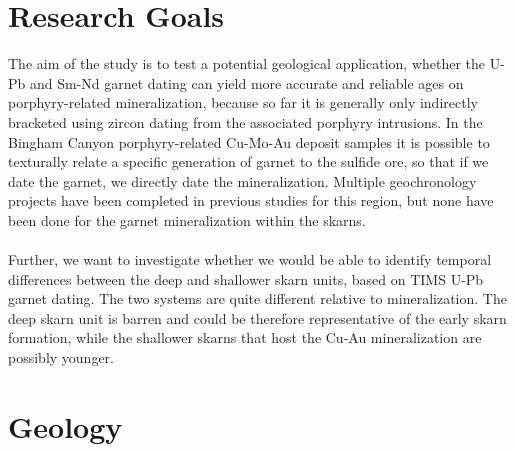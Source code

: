 \documentclass[a4paper,11pt,titlepage]{article}
\begin{document}

\vspace*{10pt}
\section{Research Goals}

The aim of the study is to test a potential geological application, whether the U-Pb and Sm-Nd garnet dating can yield more accurate and reliable ages on porphyry-related mineralization, because so far it is generally only indirectly bracketed using zircon dating from the associated porphyry intrusions. In the Bingham Canyon porphyry-related Cu-Mo-Au deposit samples it is possible to texturally relate a specific generation of garnet to the sulfide ore, so that if we date the garnet, we directly date the mineralization. Multiple geochronology projects have been completed in previous studies for this region, but none have been done for the garnet mineralization within the skarns.
\\
\\
Further, we want to investigate whether we would be able to identify temporal differences between the deep and shallower skarn units, based on TIMS U-Pb garnet dating. The two systems are quite different relative to mineralization. The deep skarn unit is barren and could be therefore representative of the early skarn formation, while the shallower skarns that host the Cu-Au mineralization are possibly younger.


\vspace*{10pt}
\section{Geology}
\end{document}
